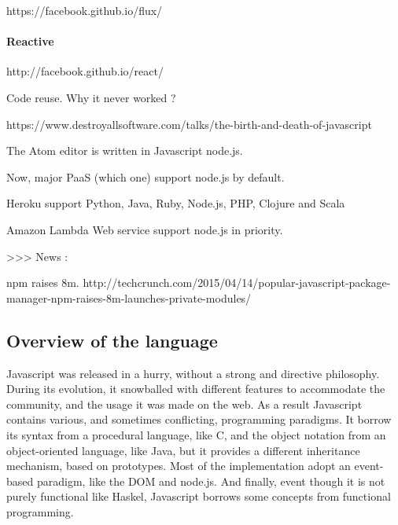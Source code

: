 https://facebook.github.io/flux/

\paragraph{Reactive}

http://facebook.github.io/react/

Code reuse.
Why it never worked ?





https://www.destroyallsoftware.com/talks/the-birth-and-death-of-javascript

The Atom editor is written in Javascript node.js.



Now, major PaaS (which one) support node.js by default.

Heroku support Python, Java, Ruby, Node.js, PHP, Clojure and Scala

Amazon Lambda Web service support node.js in priority.


>>> News :

npm raises 8m.
http://techcrunch.com/2015/04/14/popular-javascript-package-manager-npm-raises-8m-launches-private-modules/




\subsection{Overview of the language}

Javascript was released in a hurry, without a strong and directive philosophy.
During its evolution, it snowballed with different features to accommodate the community, and the usage it was made on the web. As a result Javascript contains various, and sometimes conflicting, programming paradigms.
It borrow its syntax from a procedural language, like C, and the object notation from an object-oriented language, like Java, but it provides a different inheritance mechanism, based on prototypes. Most of the implementation adopt an event-based paradigm, like the DOM and node.js.
And finally, event though it is not purely functional like Haskel, Javascript borrows some concepts from functional programming.

